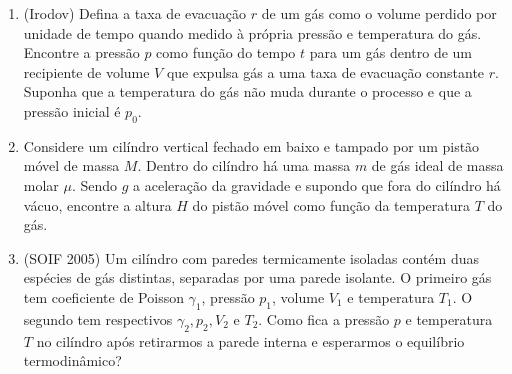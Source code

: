 \begin{enumerate}
    \item
        (Irodov) Defina a taxa de evacuação $r$ de um gás como o volume perdido
        por unidade de tempo quando medido à própria pressão e temperatura do
        gás. Encontre a pressão $p$ como função do tempo $t$ para um gás dentro
        de um recipiente de volume $V$ que expulsa gás a uma taxa de evacuação
        constante $r$. Suponha que a temperatura do gás não muda durante o
        processo e que a pressão inicial é $p_0$.

    \item
        Considere um cilíndro vertical fechado em baixo e tampado por um pistão
        móvel de massa $M$. Dentro do cilíndro há uma massa $m$ de gás ideal de
        massa molar $\mu$. Sendo $g$ a aceleração da gravidade e supondo que
        fora do cilíndro há vácuo, encontre a altura $H$ do pistão móvel como
        função da temperatura $T$ do gás.

    \item
        (SOIF 2005) Um cilíndro com paredes termicamente isoladas contém duas
        espécies de gás distintas, separadas por uma parede isolante. O primeiro
        gás tem coeficiente de Poisson $\gamma_1$, pressão $p_1$, volume $V_1$ e
        temperatura $T_1$. O segundo tem respectivos $\gamma_2,p_2,V_2$ e $T_2$.
        Como fica a pressão $p$ e temperatura $T$ no cilíndro após retirarmos a
        parede interna e esperarmos o equilíbrio termodinâmico?


\end{enumerate}
